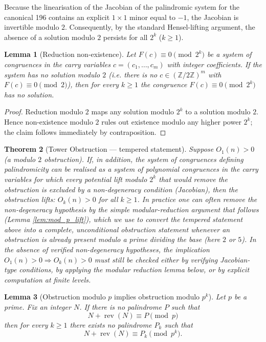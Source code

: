 \documentclass[12pt,a4paper]{article}
\newtheorem{theorem}{Theorem}[section]
\newtheorem{lemma}[theorem]{Lemma}
\begin{document}
Because the linearisation of the Jacobian of the palindromic system for the canonical 196 contains an explicit $1\times1$ minor equal to $-1$, the Jacobian is invertible modulo $2$. Consequently, by the standard Hensel-lifting argument, the absence of a solution modulo $2$ persists for all $2^{k}$ ($k\ge 1$).
\begin{lemma}[Reduction non-existence]
\label{lem:reduction_nonexist-4}
Let $F(c)\equiv 0\pmod{2^k}$ be a system of congruences in the carry variables $c=(c_1,\dots,c_m)$ with integer coefficients. If the system has no solution modulo $2$ (i.e. there is no $c\in(\mathbb Z/2\mathbb Z)^m$ with $F(c)\equiv0\pmod 2$), then for every $k\ge1$ the congruence $F(c)\equiv0\pmod{2^k}$ has no solution.
\end{lemma}

\begin{proof}
Reduction modulo $2$ maps any solution modulo $2^k$ to a solution modulo $2$. Hence non-existence modulo $2$ rules out existence modulo any higher power $2^k$; the claim follows immediately by contraposition.
\end{proof}

\begin{theorem}[Tower Obstruction --- tempered statement]\label{thm:tower-4}
Suppose $O_1(n) > 0$ (a modulo $2$ obstruction). If, in addition, the system of congruences defining palindromicity can be realised as a system of polynomial congruences in the carry variables for which every potential lift modulo $2^k$ that would remove the obstruction is excluded by a non-degeneracy condition (Jacobian), then the obstruction lifts: $O_k(n) > 0$ for all $k\ge 1$.
In practice one can often remove the non-degeneracy hypothesis by the simple modular-reduction argument that follows (Lemma \ref{lem:mod_p_lift}), which we use to convert the tempered statement above into a complete, unconditional obstruction statement whenever an obstruction is already present modulo a prime dividing the base (here $2$ or $5$).
In the absence of verified non-degeneracy hypotheses, the implication $O_1(n)>0 \Rightarrow O_k(n)>0$ must still be checked either by verifying Jacobian-type conditions, by applying the modular reduction lemma below, or by explicit computation at finite levels.
\end{theorem}

\begin{lemma}[Obstruction modulo $p$ implies obstruction modulo $p^k$]
Let $p$ be a prime. Fix an integer $N$. If there is no palindrome $P$ such that
$$N+\operatorname{rev}(N)\equiv P\pmod p$$
then for every $k\ge1$ there exists no palindrome $P_k$ such that
$$N+\operatorname{rev}(N)\equiv P_k\pmod{p^k}.$$
\end{lemma}
\end{document}
